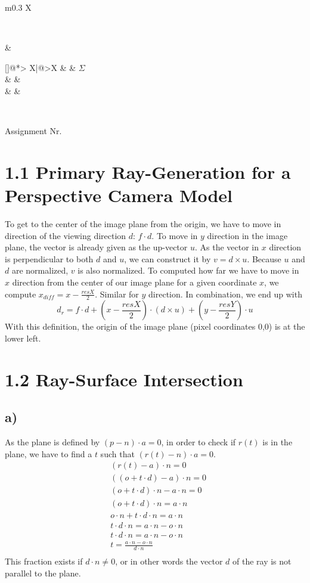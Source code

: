 \documentclass[a4paper]{scrartcl}
\makeatletter
\def\header#1#2{
  \begin{center}
    {\Large Assignment #1}\\
  \end{center}
}
\newcounter{punktelistectr}
\newcounter{punkte}
\newcommand{\punkteliste}[2]{%
  \setcounter{punkte}{#2}%
  \addtocounter{punkte}{-#1}%
  \stepcounter{punkte}%
  \begin{center}%
  \begin{tabularx}{\linewidth}[]{@{}*{\thepunkte}{>{\centering\arraybackslash} X|}@{}>{\centering\arraybackslash}X}
      \forloop{punktelistectr}{#1}{\value{punktelistectr} < #2 } %
      {%
        \thepunktelistectr &
      }
      #2 &  $\Sigma$ \\
      \hline
      \forloop{punktelistectr}{#1}{\value{punktelistectr} < #2 } %
      {%
        &
      } &\\
      \forloop{punktelistectr}{#1}{\value{punktelistectr} < #2 } %
      {%
        &
      } &\\
    \end{tabularx}
  \end{center}
}
\makeatother
\begin{document}
\begin{tabularx}{\linewidth}{m{0.3 \linewidth}X}
  \begin{minipage}{\linewidth}
    \STUDENTA\\
    \STUDENTB
  \end{minipage} & \begin{minipage}{\linewidth}
    \punkteliste{1}{\EXERCISES}
  \end{minipage}\\
\end{tabularx}
\header{Nr. \NUMBER}{\DEADLINE}


\section*{1.1 Primary Ray-Generation for a Perspective Camera Model}
To get to the center of the image plane from the origin, we have to move in
direction of the viewing direction $d$: $f\cdot d$. To move in $y$ direction
in the image plane, the vector is already given as the up-vector $u$. As the
vector in $x$ direction is perpendicular to both $d$ and $u$, we can construct
it by $v=d\times u$. Because $u$ and $d$ are normalized, $v$ is also normalized.
To computed how far we have to move in $x$ direction from the center of our
image plane for a given coordinate $x$, we compute $x_{diff}=x-\frac{resX}{2}$.
Similar for $y$ direction. In combination, we end up with
$$d_r = f \cdot d + (x - \frac{resX}{2}) \cdot (d \times u) + (y - \frac{resY}{2}) \cdot u$$
With this definition, the origin of the image plane (pixel coordinates 0,0) is at the lower left.

\section*{1.2 Ray-Surface Intersection}
    \subsection*{a)}
        As the plane is defined by $(p-n)\cdot a=0$, in order to check if $r(t)$
        is in the plane, we have to find a $t$ such that $(r(t)-n)\cdot a=0$.
        \begin{align*}
            &(r(t)-a)\cdot n=0\\
            &((o+t\cdot d)-a)\cdot n=0\\
            &(o+t\cdot d) \cdot n -a\cdot n=0\\
            &(o+t\cdot d) \cdot n =a\cdot n\\
            &o\cdot n+t\cdot d\cdot n =a\cdot n\\
            &t\cdot d\cdot n =a\cdot n-o\cdot n\\
            &t\cdot d\cdot n =a\cdot n-o\cdot n\\
            &t=\frac{a\cdot n-o\cdot n}{d\cdot n}\\
        \end{align*}
        This fraction exists if $d\cdot n \neq 0$, or in other words the vector
        $d$ of the ray is not parallel to the plane. 
\end{document}
